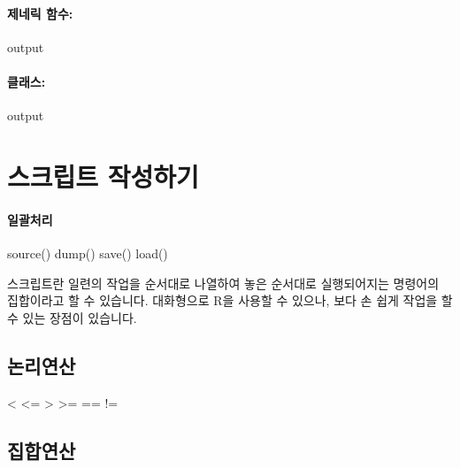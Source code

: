 \documentclass{book}
\begin{document}
\paragraph{제네릭 함수:}
\begin{Schunk}
\begin{Soutput}
output
\end{Soutput}
\end{Schunk}

\paragraph{클래스:}
\begin{Schunk}
\begin{Soutput}
output
\end{Soutput}
\end{Schunk}

\section{스크립트 작성하기}
\paragraph{일괄처리}
\begin{Schunk}
\begin{Soutput}
source()
dump()
save()
load()

\end{Soutput}
\end{Schunk}

스크립트란 일련의 작업을 순서대로 나열하여 놓은 순서대로 실행되어지는 명령어의 집합이라고 할 수 있습니다. 
대화형으로 R을 사용할 수 있으나, 보다 손 쉽게 작업을 할 수 있는 장점이 있습니다. 


\subsection{논리연산}

\begin{Schunk}
	\begin{Soutput}
		< <= > >= == !=
	\end{Soutput}
\end{Schunk}

\subsection{집합연산}
\begin{Schunk}
	\begin{Soutput}
		
	\end{Soutput}
\end{Schunk}
\end{document}

